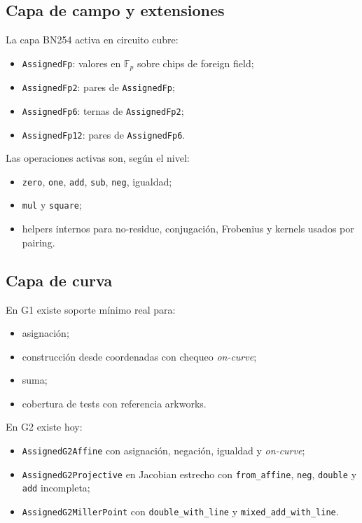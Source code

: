 \documentclass[11pt,a4paper]{article}
\begin{document}
\subsection{Capa de campo y extensiones}

La capa BN254 activa en circuito cubre:

\begin{itemize}
  \item \texttt{AssignedFp}: valores en \(\mathbb{F}_p\) sobre chips de foreign field;
  \item \texttt{AssignedFp2}: pares de \texttt{AssignedFp};
  \item \texttt{AssignedFp6}: ternas de \texttt{AssignedFp2};
  \item \texttt{AssignedFp12}: pares de \texttt{AssignedFp6}.
\end{itemize}

Las operaciones activas son, seg\'un el nivel:

\begin{itemize}
  \item \texttt{zero}, \texttt{one}, \texttt{add}, \texttt{sub}, \texttt{neg}, igualdad;
  \item \texttt{mul} y \texttt{square};
  \item helpers internos para no-residue, conjugaci\'on, Frobenius y kernels usados por pairing.
\end{itemize}

\subsection{Capa de curva}

En G1 existe soporte m\'inimo real para:

\begin{itemize}
  \item asignaci\'on;
  \item construcci\'on desde coordenadas con chequeo \emph{on-curve};
  \item suma;
  \item cobertura de tests con referencia arkworks.
\end{itemize}

En G2 existe hoy:

\begin{itemize}
  \item \texttt{AssignedG2Affine} con asignaci\'on, negaci\'on, igualdad y \emph{on-curve};
  \item \texttt{AssignedG2Projective} en Jacobian estrecho con \texttt{from\_affine}, \texttt{neg},
  \texttt{double} y \texttt{add} incompleta;
  \item \texttt{AssignedG2MillerPoint} con \texttt{double\_with\_line} y
  \texttt{mixed\_add\_with\_line}.
\end{itemize}
\end{document}
